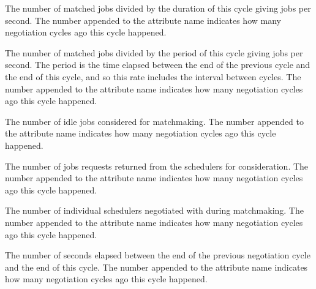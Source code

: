 \begin{description}
\label{attr:LastNegotiationCycleMatchRate<X>}
\item[\AdAttr{LastNegotiationCycleMatchRate<X>}:] 
The number of matched jobs divided by the duration of this cycle giving
jobs per second.
The number  appended to the attribute name indicates 
how many negotiation cycles ago this cycle happened.

\label{attr:LastNegotiationCycleMatchRateSustained<X>}
\item[\AdAttr{LastNegotiationCycleMatchRateSustained<X>}:] 
The number of matched jobs divided by the period of this cycle giving
jobs per second.
The period is the time elapsed between the end of the previous cycle 
and the end of this cycle,
and so this rate includes the interval between cycles.
The number  appended to the attribute name indicates 
how many negotiation cycles ago this cycle happened.

\label{attr:LastNegotiationCycleNumIdleJobs<X>}
\item[\AdAttr{LastNegotiationCycleNumIdleJobs<X>}:] 
The number of idle jobs considered for matchmaking.  
The number  appended to the attribute name indicates 
how many negotiation cycles ago this cycle happened.

\label{attr:LastNegotiationCycleNumJobsConsidered<X>}
\item[\AdAttr{LastNegotiationCycleNumJobsConsidered<X>}:] 
The number of jobs requests returned from the schedulers for consideration.
The number  appended to the attribute name indicates 
how many  negotiation  cycles ago this cycle happened.

\label{attr:LastNegotiationCycleNumSchedulers<X>}
\item[\AdAttr{LastNegotiationCycleNumSchedulers<X>}:] 
The number of individual schedulers negotiated with during matchmaking.
The number  appended to the attribute name indicates 
how many negotiation cycles ago this cycle happened.

\label{attr:LastNegotiationCyclePeriod<X>}
\item[\AdAttr{LastNegotiationCyclePeriod<X>}:] 
The number of seconds elapsed between the end of the previous 
negotiation cycle and the end of this cycle.  
The number  appended to the attribute name indicates 
how many negotiation cycles ago this cycle happened.


\end{description}
